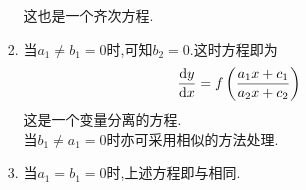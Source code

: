 \documentclass{ctexart}
\begin{document}
\begin{theorem}[2.2 可化为变量分离的方程的几类方程]
\begin{enumerate}[label=\tbf{\arabic*.}]
\begin{enumerate}[label=\tbf{\alph*.}]
\begin{enumerate}[label=\tbf{\roman*.}]
                            这也是一个齐次方程.
                        \item 当$a_1\neq b_1=0$时,可知$b_2=0$.这时方程即为
                            \[\dfrac{\mathrm{d} y}{\mathrm{d} x}=f\left(\dfrac{a_1x+c_1}{a_2x+c_2}\right)\]
                            这是一个变量分离的方程.\\
                            当$b_1\neq a_1=0$时亦可采用相似的方法处理.
                        \item 当$a_1=b_1=0$时,上述方程即与相同.
                    \end{enumerate}
            \end{enumerate}
    \end{enumerate}
\end{theorem}
\end{document}
